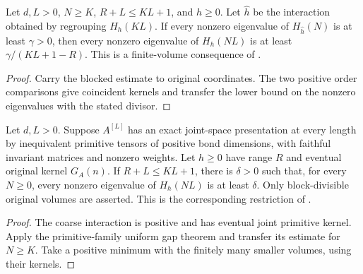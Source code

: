 \begin{lemma}
    \label{thm:blocked_finite_gap_transfer}
    \leanok
    Let $d,L>0$, $N\geq K$, $R+L\leq KL+1$, and $h\geq0$.
    Let $\widehat h$ be the interaction obtained by regrouping $H_h(KL)$.
    If every nonzero eigenvalue of $H_{\widehat h}(N)$ is at least
    $\gamma>0$, then every nonzero eigenvalue of $H_h(NL)$ is at least
    $\gamma/(KL+1-R)$.
    This is a finite-volume consequence of
    \cite[Section~3, equations~(3.12)--(3.14)]{Nachtergaele1996Spectral}.
\end{lemma}
\begin{proof}\leanok
    Carry the blocked estimate to original coordinates.
    The two positive order comparisons give coincident kernels and
    transfer the lower bound on the nonzero eigenvalues with the stated
    divisor.
\end{proof}

\begin{lemma}
    \label{thm:blocked_primitive_aligned_uniform_gap}
    \leanok
    Let $d,L>0$. Suppose $A^{[L]}$ has an exact joint-space presentation
    at every length by inequivalent primitive tensors of positive bond
    dimensions, with faithful invariant matrices and nonzero weights.
    Let $h\geq0$ have range $R$ and eventual original kernel $G_A(n)$. If
    $R+L\leq KL+1$, there is $\delta>0$ such that, for every $N\geq0$,
    every nonzero eigenvalue of $H_h(NL)$ is at least $\delta$.
    Only block-divisible original volumes are asserted. This is the
    corresponding restriction of
    \cite[Theorem~1.2]{Nachtergaele1996Spectral}.
\end{lemma}
\begin{proof}\leanok
    The coarse interaction is positive and has eventual joint primitive
    kernel. Apply the primitive-family uniform gap theorem and transfer
    its estimate for $N\geq K$. Take a positive minimum with the finitely
    many smaller volumes, using their kernels.
\end{proof}


